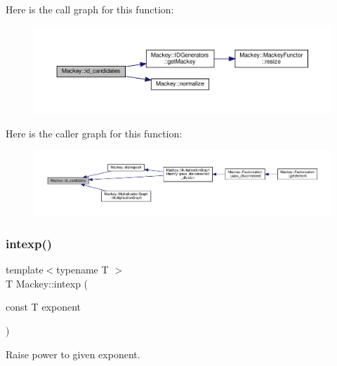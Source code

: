 Here is the call graph for this function\+:\nopagebreak
\begin{figure}[H]
\begin{center}
\leavevmode
\includegraphics[width=350pt]{namespaceMackey_a83ac78e6d1695af40d0fa58af5255e84_cgraph}
\end{center}
\end{figure}
Here is the caller graph for this function\+:\nopagebreak
\begin{figure}[H]
\begin{center}
\leavevmode
\includegraphics[width=350pt]{namespaceMackey_a83ac78e6d1695af40d0fa58af5255e84_icgraph}
\end{center}
\end{figure}
\mbox{\label{namespaceMackey_a4904fdc0fdcf3c23d7f3b80f59b2eafa}} 
\subsubsection{\texorpdfstring{intexp()}{intexp()}}
{\footnotesize\ttfamily template$<$typename T $>$ \\
T Mackey\+::intexp (\begin{DoxyParamCaption}\item[{const T}]{exponent }\end{DoxyParamCaption})\hspace{0.3cm}{\ttfamily [inline]}}



Raise power to given exponent. 

